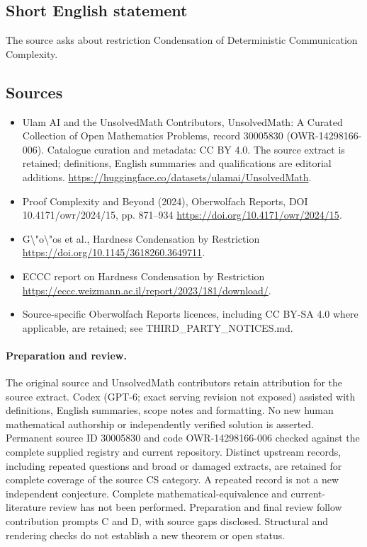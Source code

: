 \documentclass[11pt]{article}
\begin{document}
\subsection{Short English statement}
The source asks about restriction Condensation of Deterministic Communication Complexity.
\subsection{Sources}
\begin{itemize}
\item[\hypertarget{source:30005830:1}{S1}] Ulam AI and the UnsolvedMath Contributors, UnsolvedMath: A Curated Collection of Open Mathematics Problems, record 30005830 (OWR-14298166-006). Catalogue curation and metadata: CC BY 4.0. The source extract is retained; definitions, English summaries and qualifications are editorial additions.
\url{https://huggingface.co/datasets/ulamai/UnsolvedMath}.
\item[\hypertarget{source:30005830:2}{S2}] Proof Complexity and Beyond (2024), Oberwolfach Reports, DOI 10.4171/owr/2024/15, pp. 871--934
\url{https://doi.org/10.4171/owr/2024/15}.
\item[\hypertarget{source:30005830:3}{S3}] G\textbackslash{}"o\textbackslash{}"os et al., Hardness Condensation by Restriction
\url{https://doi.org/10.1145/3618260.3649711}.
\item[\hypertarget{source:30005830:4}{S4}] ECCC report on Hardness Condensation by Restriction
\url{https://eccc.weizmann.ac.il/report/2023/181/download/}.
\item Source-specific Oberwolfach Reports licences, including CC BY-SA 4.0 where applicable, are retained; see THIRD\_PARTY\_NOTICES.md.
\end{itemize}
\paragraph{Preparation and review.}
The original source and UnsolvedMath contributors retain attribution for the source extract. Codex (GPT-6; exact serving revision not exposed) assisted with definitions, English summaries, scope notes and formatting. No new human mathematical authorship or independently verified solution is asserted. Permanent source ID 30005830 and code OWR-14298166-006 checked against the complete supplied registry and current repository. Distinct upstream records, including repeated questions and broad or damaged extracts, are retained for complete coverage of the source CS category. A repeated record is not a new independent conjecture. Complete mathematical-equivalence and current-literature review has not been performed. Preparation and final review follow contribution prompts C and D, with source gaps disclosed. Structural and rendering checks do not establish a new theorem or open status.
\label{end:30005830}
\end{document}
